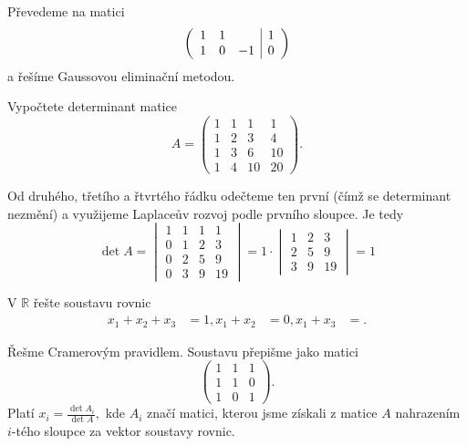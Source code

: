 \begin{reseni}
Převedeme na matici
$$
\left (
\begin{array}{c c c | c }
1 & 1 & & 1\\
1  & 0 &-1  &0
\end{array}
\right )
$$
a řešíme Gaussovou eliminační metodou.
\end{reseni}

\begin{priklad}
Vypočtete determinant matice
$$A=\begin{pmatrix}
    1  &1 &1 &1\\
    1 &2 &3 &4 \\
    1 &3 &6 &10\\
    1 &4 &10 &20
\end{pmatrix}.$$
\end{priklad}

\begin{reseni}
Od druhého, třetího a řtvrtého řádku odečteme ten první (čímž se determinant nezmění)
a využijeme Laplaceův rozvoj podle prvního sloupce. Je tedy
$$\det A = \begin{vmatrix}
    1 &1 &1 &1\\
    0 &1 &2 &3 \\
    0 &2 &5 &9 \\
    0 &3 &9 &19
\end{vmatrix}=1 \cdot \begin{vmatrix}
1 &2 &3 \\
2 &5 &9\\
3 &9 &19
\end{vmatrix}=1$$
\end{reseni}

\begin{priklad}
V $\mathbb R$ řešte  soustavu rovnic
\begin{align*}
    x_1+x_2+x_3 &=1,
    x_1+x_2 &= 0,
    x_1+x_3 &=.
\end{align*}
\end{priklad}

\begin{reseni}
Řešme Cramerovým pravidlem. Soustavu přepišme jako matici
$$
\begin{pmatrix}
    1 & 1&1\\
    1 &1 &0 \\
    1 &0 &1
\end{pmatrix}.
$$
Platí $x_i=\frac{\det A_i}{\det A},$ kde $A_i$ značí matici, kterou jsme získali
z matice $A$ nahrazením $i$-tého sloupce za vektor  soustavy rovnic.
\end{reseni}

